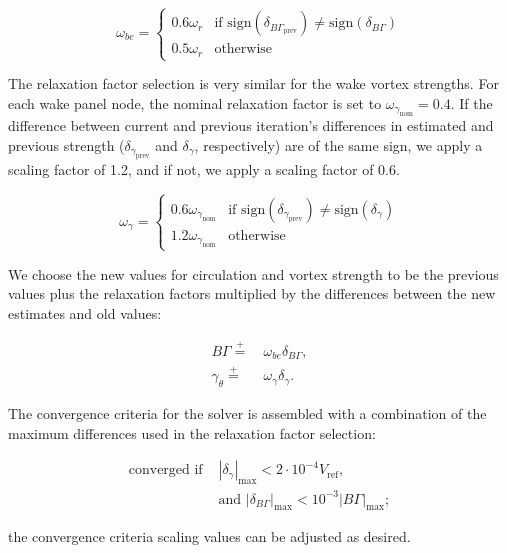 \begin{equation}
    \label{eqn:circulationrelaxation}
    \omega_{be} =
    \begin{cases}
        0.6 \omega_r & \text{if } \text{sign}(\delta_{B\Gamma_\text{prev}}) \neq \text{sign}(\delta_{B\Gamma}) \\
        0.5 \omega_r & \text{otherwise}
    \end{cases}
\end{equation}

The relaxation factor selection is very similar for the wake vortex strengths.
%
For each wake panel node, the nominal relaxation factor is set to \(\omega_{\gamma_\text{nom}} = 0.4\).
%
If the difference between current and previous iteration's differences in estimated and previous strength (\(\delta_{\gamma_\text{prev}}\) and \(\delta_\gamma\), respectively) are of the same sign, we apply a scaling factor of 1.2, and if not, we apply a scaling factor of 0.6.

\begin{equation}
    \label{eqn:gammathetarelaxation}
    \omega_\gamma =
    \begin{cases}
        0.6\omega_{\gamma_\text{nom}} &\text{if } \text{sign}(\delta_{\gamma_\text{prev}}) \neq \text{sign}(\delta_{\gamma}) \\
        1.2\omega_{\gamma_\text{nom}} & \text{otherwise}
    \end{cases}
\end{equation}

We choose the new values for circulation and vortex strength to be the previous values plus the relaxation factors multiplied by the differences between the new estimates and old values:

\begin{align}
    \label{eqn:updatecirculation}
    B\Gamma \stackrel{+}{=}&~ \omega_{be} \delta_{B\Gamma}, \\
    \label{eqn:updategammatheta}
    \gamma_\theta \stackrel{+}{=}&~ \omega_\gamma \delta_\gamma.
\end{align}

The convergence criteria for the solver is assembled with a combination of the maximum differences used in the relaxation factor selection:

\begin{equation}
    \label{eqn:convergencecrit}
    \begin{aligned}
        \text{converged if } &|\delta_\gamma|_\text{max} < 2\cdot10^{-4} V_\text{ref}, \\
    &\text{and  } |\delta_{B\Gamma}|_\text{max} < 10^{-3}|B\Gamma|_\text{max};
    \end{aligned}
\end{equation}

\where the convergence criteria scaling values can be adjusted as desired.
